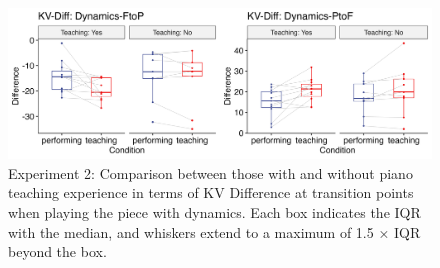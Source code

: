 \documentclass[
  man,floatsintext]{apa6}
\begin{document}
\begin{figure}
\includegraphics[width=1\linewidth]{manuscript_files/figure-latex/plot-dyn-diff-teaching-2-1} \caption{\label{fig:dyn-diff-teaching-2}Experiment 2: Comparison between those with and without piano teaching experience in terms of KV Difference at transition points when playing the piece with dynamics. Each box indicates the IQR with the median, and whiskers extend to a maximum of 1.5 × IQR beyond the box.}\label{fig:plot-dyn-diff-teaching-2}
\end{figure}
\end{document}

